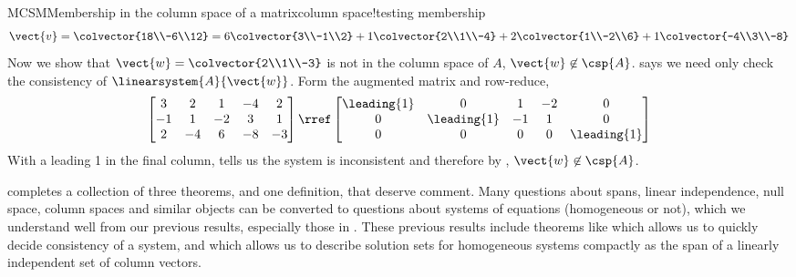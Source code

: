 \begin{example}{MCSM}{Membership in the column space of a matrix}{column space!testing membership}
%
\begin{equation*}
\vect{v}=\colvector{18\\-6\\12}=
6\colvector{3\\-1\\2}+
1\colvector{2\\1\\-4}+
2\colvector{1\\-2\\6}+
1\colvector{-4\\3\\-8}
\end{equation*}
%
Now we show that $\vect{w}=\colvector{2\\1\\-3}$ is not in the column space of $A$, $\vect{w}\not\in\csp{A}$.   says we need only check the consistency of $\linearsystem{A}{\vect{w}}$.  Form the augmented matrix and row-reduce,
%
\begin{equation*}
\begin{bmatrix}
3 & 2 & 1 & -4 & 2\\
-1 & 1 & -2 & 3 & 1\\
2 & -4 & 6 & -8 & -3
\end{bmatrix}
%
\rref
%
\begin{bmatrix}
\leading{1} & 0 & 1 & -2 & 0\\
0 & \leading{1} & -1 & 1 & 0\\
0 & 0 & 0 & 0 & \leading{1}
\end{bmatrix}
\end{equation*}
%
With a leading 1 in the final column,  tells us the system is inconsistent and therefore by , $\vect{w}\not\in\csp{A}$.
%
\end{example}
%
%
 completes a collection of three theorems, and one definition, that deserve comment.  Many questions about spans, linear independence, null space, column spaces and similar objects can be converted to questions about systems of equations (homogeneous or not), which we understand well from our previous results, especially those in .  These previous results include theorems like  which allows us to quickly decide consistency of a system, and  which allows us to describe solution sets for homogeneous systems compactly as the span of a linearly independent set of column vectors.\par
